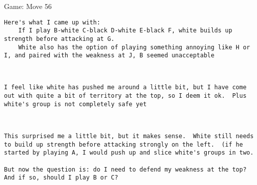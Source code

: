 \documentclass{article}
\begin{document}
\begin{section}{Game: Move 56}
\begin{center}
\begin{lstlisting}
Here's what I came up with:
	If I play B-white C-black D-white E-black F, white builds up strength before attacking at G.
	White also has the option of playing something annoying like H or I, and paired with the weakness at J, B seemed unacceptable\end{lstlisting}
\end{center}
\begin{center}
\cleargoban
{}
\showfullgoban
\\\begin{lstlisting}
I feel like white has pushed me around a little bit, but I have come out with quite a bit of territory at the top, so I deem it ok.  Plus white's group is not completely safe yet\end{lstlisting}
\end{center}
\begin{center}
\cleargoban
{}
\showfullgoban
\\\begin{lstlisting}
This surprised me a little bit, but it makes sense.  White still needs to build up strength before attacking strongly on the left.  (if he started by playing A, I would push up and slice white's groups in two.

But now the question is: do I need to defend my weakness at the top?  And if so, should I play B or C?


\end{lstlisting}
\end{center}
\end{section}
\end{document}
